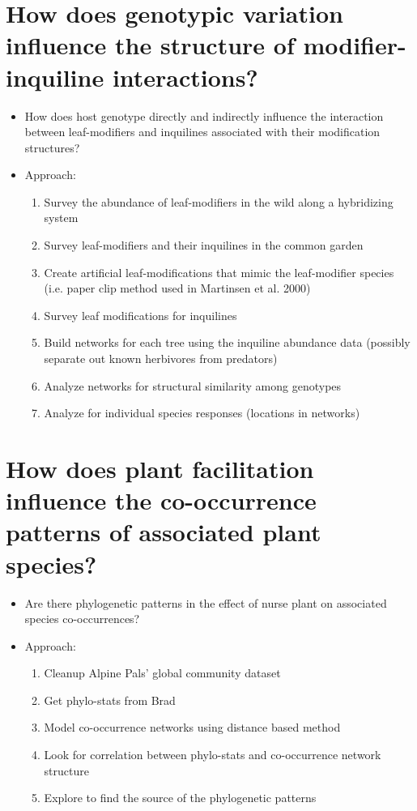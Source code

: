 \documentclass[12pt]{article}
\begin{document}
\section{How does genotypic variation influence the structure of
  modifier-inquiline interactions?}
\begin{itemize}
\item How does host genotype directly and indirectly influence the
  interaction between leaf-modifiers and inquilines associated with
  their modification structures?
\item Approach:
  \begin{enumerate}
  \item Survey the abundance of leaf-modifiers in the wild along a
    hybridizing system
  \item Survey leaf-modifiers and their inquilines in the common garden
  \item Create artificial leaf-modifications that mimic the
    leaf-modifier species (i.e. paper clip method used in Martinsen et
    al. 2000)
  \item Survey leaf modifications for inquilines
  \item Build networks for each tree using the inquiline abundance
    data (possibly separate out known herbivores from predators)
  \item Analyze networks for structural similarity among genotypes
  \item Analyze for individual species responses (locations in
    networks)
  \end{enumerate}
\end{itemize}

\section{How does plant facilitation influence the co-occurrence patterns
of associated plant species?}

\begin{itemize}
\item Are there phylogenetic patterns in the effect of nurse plant on
  associated species co-occurrences?
\item Approach:
  \begin{enumerate}
  \item Cleanup Alpine Pals' global community dataset
  \item Get phylo-stats from Brad
  \item Model co-occurrence networks using distance based method
  \item Look for correlation between phylo-stats and co-occurrence
    network structure
  \item Explore to find the source of the phylogenetic patterns
  \end{enumerate}
\end{itemize}
\end{document}
